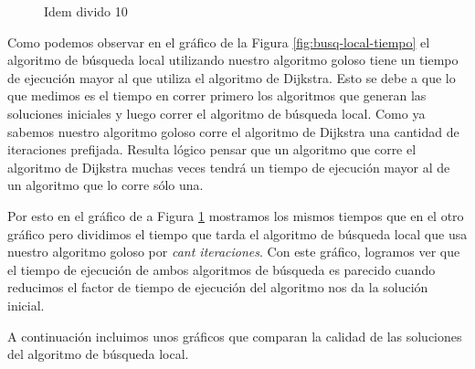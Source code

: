 \begin{figure}[H]
\begin{minipage}{0.5\linewidth}
    \caption{Idem divido 10}\label{fig:busq-local-tiempo-div10}
  \end{minipage}
\end{figure}

Como podemos observar en el gráfico de la Figura \ref{fig:busq-local-tiempo} el algoritmo de búsqueda local utilizando nuestro algoritmo goloso tiene un tiempo de ejecución mayor al que utiliza el algoritmo de Dijkstra. Esto se debe a que lo que medimos es el tiempo en correr primero los algoritmos que generan las soluciones iniciales y luego correr el algoritmo de búsqueda local. Como ya sabemos nuestro algoritmo goloso corre el algoritmo de Dijkstra una cantidad de iteraciones prefijada. Resulta lógico pensar que un algoritmo que corre el algoritmo de Dijkstra muchas veces tendrá un tiempo de ejecución mayor al de un algoritmo que lo corre sólo una.

Por esto en el gráfico de a Figura \ref{fig:busq-local-tiempo-div10} mostramos los mismos tiempos que en el otro gráfico pero dividimos el tiempo que tarda el algoritmo de búsqueda local que usa nuestro algoritmo goloso por \emph{cant iteraciones}. Con este gráfico, logramos ver que el tiempo de ejecución de ambos algoritmos de búsqueda es parecido cuando reducimos el factor de tiempo de ejecución del algoritmo nos da la solución inicial.

A continuación incluimos unos gráficos que comparan la calidad de las soluciones del algoritmo de búsqueda local.


